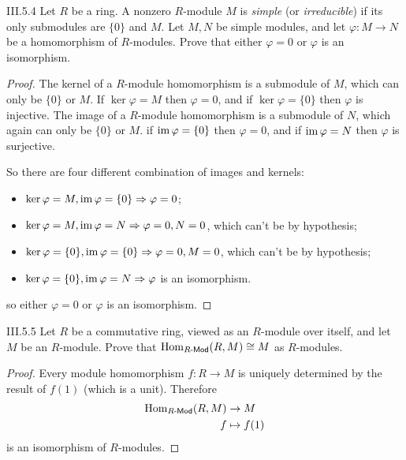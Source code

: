\begin{problem}{III.5.4}
Let $R$ be a ring. A nonzero $R$-module $M$ is \emph{simple} (or \emph{irreducible}) if its only 
submodules are $\{0\}$ and $M$. Let $M, N$ be simple modules, and let $\varphi: M \to N$ be 
a homomorphism of $R$-modules. Prove that either $\varphi = 0$ or $\varphi$ is an isomorphism. 
\end{problem}
\begin{proof}
The kernel of a $R$-module homomorphism is a submodule of $M$, which can only be $\{0\}$ or $M$. If $\ker \varphi = M$ then $\varphi = 0$, and if $\ker \varphi = \{0\}$ then $\varphi$ is injective. The image of a $R$-module homomorphism is a submodule of $N$, which again can only be $\{0\}$ or $M$. if $\operatorname{im} \varphi = \{0\}$ then $\varphi = 0$, and if $\operatorname{im} \varphi = N$ then $\varphi$ is surjective. 

So there are four different combination of images and kernels:
\begin{itemize}
    \setlength\itemsep{0pt}
    \item $\ker \varphi = M, \operatorname{im} \varphi = \{0\} \Rightarrow \varphi = 0$;
    \item $\ker \varphi = M, \operatorname{im} \varphi = N \Rightarrow \varphi = 0, N = 0$, which can't be by hypothesis;
    \item $\ker \varphi = \{0\}, \operatorname{im} \varphi = \{0\} \Rightarrow \varphi = 0, M = 0$, which can't be by hypothesis;
    \item $\ker \varphi = \{0\}, \operatorname{im} \varphi = N \Rightarrow \varphi$ is an isomorphism.
\end{itemize}
so either $\varphi = 0$ or $\varphi$ is an isomorphism. 
\end{proof}

\begin{problem}{III.5.5}
Let $R$ be a commutative ring, viewed as an $R$-module over itself, and let $M$ be an $R$-module. Prove that $\operatorname{Hom}_{R\textsf{-Mod}}(R,M) \cong M$ as $R$-modules.
\end{problem}
\begin{proof}
Every module homomorphism $f: R \to M$ is uniquely determined by the result of $f(1)$ (which is a unit). Therefore 
\begin{align*}
    \operatorname{Hom}_{R\textsf{-Mod}}(R,M) &\to M \\
    f &\mapsto f(1)
\end{align*}
is an isomorphism of $R$-modules.
\end{proof}

